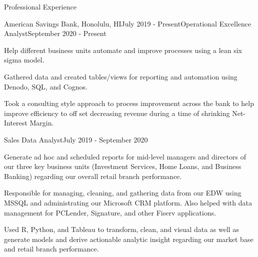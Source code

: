 \documentclass{resume} %
\begin{document}
\begin{rSection}{Professional Experience}

\begin{rSubsection}{American Savings Bank, Honolulu, HI}{July 2019 - Present}{Operational Excellence Analyst}{September 2020 - Present}
\item Help different business units automate and improve processes using a lean six sigma model.
\item Gathered data and created tables/views for reporting and automation using Denodo, SQL, and Cognos.
\item Took a consulting style approach to process improvement across the bank to help improve efficiency to off set decreasing revenue during a time of shrinking Net-Interest Margin.
\end{rSubsection}

\vspace{-1.3em}

\begin{rSubsection}{}{}{Sales Data Analyst}{July 2019 - September 2020}
\item Generate ad hoc and scheduled reports for mid-level managers and directors of our three key business units (Investment Services, Home Loans, and Business Banking) regarding our overall retail branch performance.
\item Responsible for managing, cleaning, and gathering data from our EDW using MSSQL and administrating our Microsoft CRM platform. Also helped with data management for PCLender, Signature, and other Fiserv applications.
\item Used R, Python, and Tableau to transform, clean, and visual data as well as generate models and derive actionable analytic insight regarding our market base and retail branch performance.
\end{rSubsection}

\end{rSection}
\end{document}
